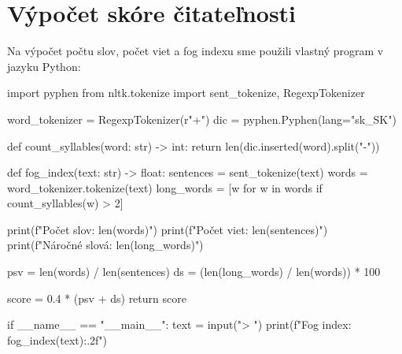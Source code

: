 \thispagestyle{empty}
\chapter{Výpočet skóre čitateľnosti}
\renewcommand*{\thepage}{C-\arabic{page}}

Na výpočet počtu slov, počet viet a fog indexu sme použili vlastný program v jazyku Python:
\begin{solution}
import pyphen
from nltk.tokenize import sent_tokenize, RegexpTokenizer

word_tokenizer = RegexpTokenizer(r"\w+")
dic = pyphen.Pyphen(lang="sk_SK")

def count_syllables(word: str) -> int:
    return len(dic.inserted(word).split("-"))

def fog_index(text: str) -> float:
    sentences = sent_tokenize(text)
    words = word_tokenizer.tokenize(text)
    long_words = [w for w in words if count_syllables(w) > 2]

    print(f"Počet slov: {len(words)}")
    print(f"Počet viet: {len(sentences)}")
    print(f"Náročné slová: {len(long_words)}")

    psv = len(words) / len(sentences)
    ds = (len(long_words) / len(words)) * 100

    score = 0.4 * (psv + ds)
    return score

if __name__ == "__main__":
    text = input("> ")
    print(f"Fog index: {fog_index(text):.2f}")
\end{solution}